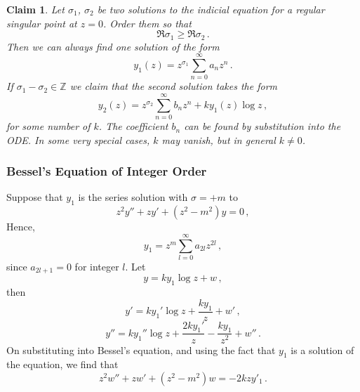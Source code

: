 \documentclass{article}
\theoremstyle{plain}\theoremheaderfont{\normalfont\itshape}\theorembodyfont{\rmfamily}\theoremseparator{.}\newtheorem*{rem}{Remark}\newtheorem*{ex}{Example}\newtheorem*{proof}{Proof}\newtheorem*{altp}{Alternative proof}
\theoremstyle{plain}\theoremheaderfont{\normalfont\bfseries}\theorembodyfont{\rmfamily}\theoremseparator{.}\newtheorem{thm}{Theorem}[section]\newtheorem{lem}[thm]{Lemma}\newtheorem{prop}[thm]{Proposition}\newtheorem*{cor}{Corollary}\newtheorem{defn}[thm]{Definition}\newtheorem{clm}[thm]{Claim}\newtheorem{clminproof}{Claim}
\theoremstyle{break}\theoremheaderfont{\normalfont\itshape}\theorembodyfont{\rmfamily}\theoremseparator{.\medskip}\newtheorem*{proofskip}{Proof}\newtheorem*{exs}{Examples}\newtheorem*{rems}{Remarks}
\theoremstyle{break}\theoremheaderfont{\normalfont\bfseries}\theorembodyfont{\rmfamily}\theoremseparator{.\medskip}\newtheorem{lemskip}[thm]{Lemma}\newtheorem{defnskip}[thm]{Definition}\newtheorem{propskip}[thm]{Proposition}\newtheorem{thmskip}[thm]{Theorem}
\numberwithin{equation}{section}
\begin{document}
	\begin{clm}
		Let \(\sigma_1\), \(\sigma_2\) be two solutions to the indicial equation for a regular singular point at \(z=0\). Order them so that
		\[\Re{\sigma_1}\ge\Re{\sigma_2}\,.\]
		Then we can always find one solution of the form
		\[y_1(z)=z^{\sigma_1}\sum_{n=0}^{\infty}a_n z^n\,.\]
		If \(\sigma_1-\sigma_2\in\mathbb{Z}\) we claim that the second solution takes the form
		\[y_2(z)=z^{\sigma_2}\sum_{n=0}^{\infty}b_nz^n+ky_1(z)\log z\,,\]
		for some number of \(k\). The coefficient \(b_n\) can be found by substitution into the ODE. In some very special cases, \(k\) may vanish, but in general \(k\ne 0\).
	\end{clm}

	\subsubsection*{Bessel's Equation of Integer Order}
	Suppose that \(y_1\) is the series solution with \(\sigma=+m\) to
	\[z^2y''+zy'+(z^2-m^2)y=0\,,\]
	Hence,
	\[y_1=z^m\sum_{l=0}^{\infty}a_{2l}z^{2l}\,,\]
	since \(a_{2l+1}=0\) for integer \(l\). Let
	\[y=ky_1\log z+w\,,\]
	then
	\[y'=ky_1'\log z+\frac{ky_1}{z}+w'\,,\]
	\[y''=ky_1''\log z+\frac{2ky_1'}{z}-\frac{ky_1}{z^2}+w''\,.\]
	On substituting into Bessel's equation, and using the fact that \(y_1\) is a solution of the equation, we find that
	\[z^2w''+zw'+(z^2-m^2)w=-2kzy'_1\,.\]
\end{document}
